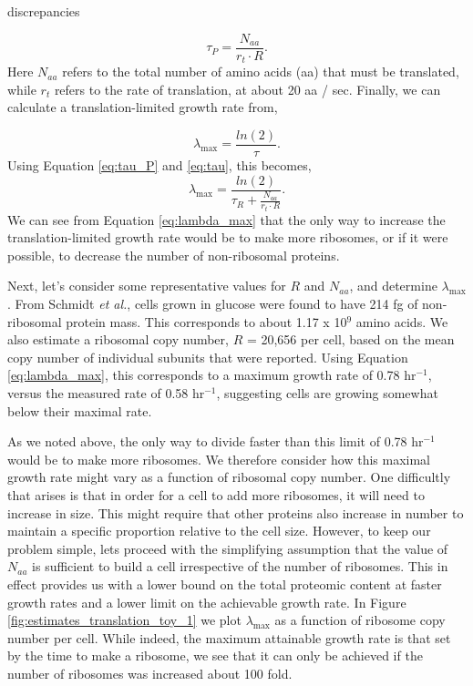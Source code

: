 discrepancies \documentclass[11pt, letterpaper]{article}
\begin{document}
\begin{equation}
\tau_P = \frac{N_{aa}}{r_t \cdot R}.
\label{eq:tau_P}
\end{equation}
Here $N_{aa}$ refers to the total number of amino acids (aa) that must be translated,
while $r_t$ refers to the rate of translation, at about 20 aa /
sec. Finally, we can calculate a translation-limited growth rate from,

\begin{equation}
\lambda_{\text{max}} =  \frac{ln(2)} {\tau}.
\end{equation}
Using Equation \ref{eq:tau_P} and \ref{eq:tau}, this becomes,
\begin{equation}
\lambda_{\text{max}} =  \frac{ln(2)} {\tau_R + \frac{N_{aa}}{r_t \cdot R}}.
\label{eq:lambda_max}
\end{equation}
We can see from Equation \ref{eq:lambda_max} that the only way to increase the
translation-limited growth rate would be to make more ribosomes, or if it were
possible, to decrease the number of non-ribosomal proteins.

Next, let's consider some representative values for $R$ and $N_{aa}$, and
determine $\lambda_{\text{max}}$. From Schmidt {\it et al.}\cite{Schmidt2016},
cells grown in glucose were found to have 214 fg of non-ribosomal  protein mass.
This corresponds to about 1.17 x 10$^9$ amino acids. We also estimate a
ribosomal copy number, $R$ = 20,656 per cell, based on the mean copy number of
individual subunits that were reported. Using Equation
\ref{eq:lambda_max}, this corresponds to a maximum growth rate of 0.78 hr$^{-1}$,
versus the measured rate of 0.58 hr$^{-1}$, suggesting cells are growing somewhat below their maximal rate.

As we noted above, the only way to divide faster than this limit of 0.78 hr$^{-1}$
would be to make more ribosomes. We therefore consider how this maximal growth
rate might vary as a function of ribosomal copy number. One difficultly that
arises is that in order for a cell to add more ribosomes, it will need to
increase in size. This might require that other proteins also increase in number to
maintain a specific proportion relative to the cell size. However, to keep our problem simple, lets proceed
with the simplifying assumption that the value of $N_{aa}$ is sufficient to
build a cell irrespective of the number of ribosomes. This in effect provides us with a
lower bound on the total proteomic content at faster growth rates and a lower
limit on the achievable growth rate. In Figure \ref{fig:estimates_translation_toy_1}
we plot $\lambda_{\text{max}}$ as a function
of ribosome copy number per cell. While indeed, the maximum attainable growth
rate is that set by the time to make a ribosome, we see that it can only be
achieved if the number of ribosomes was increased about 100 fold.
\end{document}

